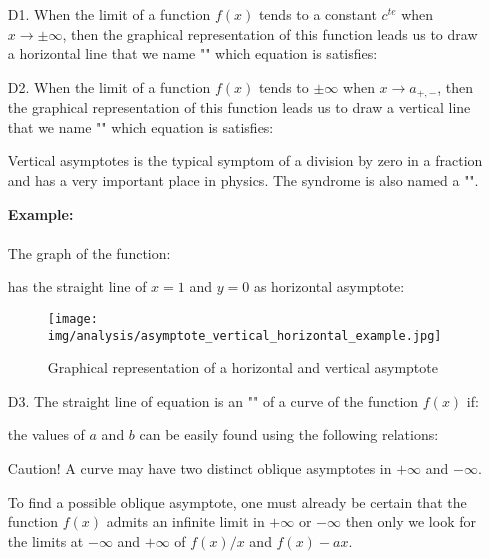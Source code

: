 	\begin{enumerate}
		\item[D1.] When the limit of a function $f(x)$ tends to a constant 
$c^{te}$ when $x \rightarrow \pm \infty$, then the graphical representation of this function leads us to draw a horizontal line that we name "" which equation is satisfies:
		
		
		\item[D2.] When the limit of a function $f(x)$ tends to  
$\pm \infty$ when $x \rightarrow a_{+,-}$, then the graphical representation of this function leads us to draw a vertical line that we name "" which equation is satisfies:
		
		Vertical asymptotes is the typical symptom of a division by zero in a fraction and has a very important place in physics. The syndrome is also named a "".
		\begin{tcolorbox}[colframe=black,colback=white,sharp corners]
		\textbf{{\Large {}}Example:}\\\\
		The graph of the function:
		
		 has the straight line of $x=1$ and $y=0$ as horizontal asymptote:
		 \begin{figure}[H]
			\centering
			\texttt{[image: img/analysis/asymptote\_vertical\_horizontal\_example.jpg]}
			\caption{Graphical representation of a  horizontal and vertical asymptote}
		\end{figure}
		\end{tcolorbox}
		
		\item[D3.] The straight line of equation is an "" of a curve of the function $f (x)$ if:
		
		the values of $a$ and $b$ can be easily found using the following relations:
		
		
		\begin{tcolorbox}[colback=red!5,borderline={1mm}{2mm}{red!5},arc=0mm,boxrule=0pt]
		\bcbombe Caution! A curve may have two distinct oblique asymptotes in $+\infty$ and $-\infty$.
		\end{tcolorbox}
		
		To find a possible oblique asymptote, one must already be certain that the function $f(x)$ admits an infinite limit in $+\infty$ or $-\infty$ then only we look for the limits at $-\infty$ and $+\infty$ of  $f (x) / x$ and $f(x)-ax$.
		

\end{enumerate}
